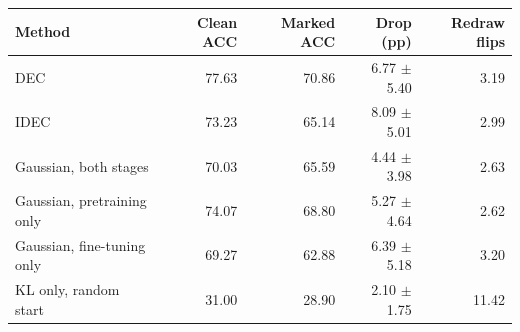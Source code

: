 \begin{tabular}{lrrrr}
\toprule
Method & Clean ACC & Marked ACC & Drop (pp) & Redraw flips\\
\midrule
DEC & 77.63 & 70.86 & 6.77 $\pm$ 5.40 & 3.19\\
IDEC & 73.23 & 65.14 & 8.09 $\pm$ 5.01 & 2.99\\
Gaussian, both stages & 70.03 & 65.59 & 4.44 $\pm$ 3.98 & 2.63\\
Gaussian, pretraining only & 74.07 & 68.80 & 5.27 $\pm$ 4.64 & 2.62\\
Gaussian, fine-tuning only & 69.27 & 62.88 & 6.39 $\pm$ 5.18 & 3.20\\
KL only, random start & 31.00 & 28.90 & 2.10 $\pm$ 1.75 & 11.42\\
\bottomrule
\end{tabular}

